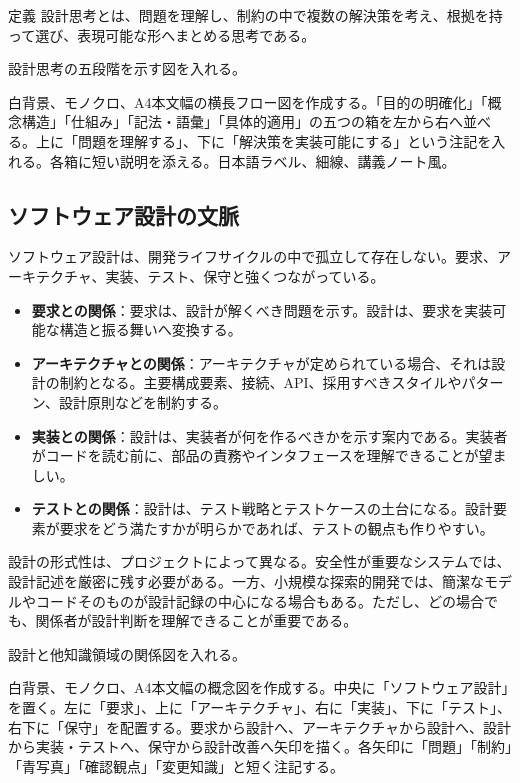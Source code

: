 \documentclass[10.5pt,a4paper]{ltjsarticle}
\begin{document}
\begin{pointbox}{定義}
設計思考とは、問題を理解し、制約の中で複数の解決策を考え、根拠を持って選び、表現可能な形へまとめる思考である。
\end{pointbox}

\begin{todobox}
設計思考の五段階を示す図を入れる。
\end{todobox}
\begin{promptbox}
白背景、モノクロ、A4本文幅の横長フロー図を作成する。「目的の明確化」「概念構造」「仕組み」「記法・語彙」「具体的適用」の五つの箱を左から右へ並べる。上に「問題を理解する」、下に「解決策を実装可能にする」という注記を入れる。各箱に短い説明を添える。日本語ラベル、細線、講義ノート風。
\end{promptbox}

\subsection{ソフトウェア設計の文脈}

ソフトウェア設計は、開発ライフサイクルの中で孤立して存在しない。要求、アーキテクチャ、実装、テスト、保守と強くつながっている。

\begin{itemize}
  \item \textbf{要求との関係}：要求は、設計が解くべき問題を示す。設計は、要求を実装可能な構造と振る舞いへ変換する。
  \item \textbf{アーキテクチャとの関係}：アーキテクチャが定められている場合、それは設計の制約となる。主要構成要素、接続、API、採用すべきスタイルやパターン、設計原則などを制約する。
  \item \textbf{実装との関係}：設計は、実装者が何を作るべきかを示す案内である。実装者がコードを読む前に、部品の責務やインタフェースを理解できることが望ましい。
  \item \textbf{テストとの関係}：設計は、テスト戦略とテストケースの土台になる。設計要素が要求をどう満たすかが明らかであれば、テストの観点も作りやすい。
\end{itemize}

設計の形式性は、プロジェクトによって異なる。安全性が重要なシステムでは、設計記述を厳密に残す必要がある。一方、小規模な探索的開発では、簡潔なモデルやコードそのものが設計記録の中心になる場合もある。ただし、どの場合でも、関係者が設計判断を理解できることが重要である。

\begin{todobox}
設計と他知識領域の関係図を入れる。
\end{todobox}
\begin{promptbox}
白背景、モノクロ、A4本文幅の概念図を作成する。中央に「ソフトウェア設計」を置く。左に「要求」、上に「アーキテクチャ」、右に「実装」、下に「テスト」、右下に「保守」を配置する。要求から設計へ、アーキテクチャから設計へ、設計から実装・テストへ、保守から設計改善へ矢印を描く。各矢印に「問題」「制約」「青写真」「確認観点」「変更知識」と短く注記する。
\end{promptbox}
\end{document}
